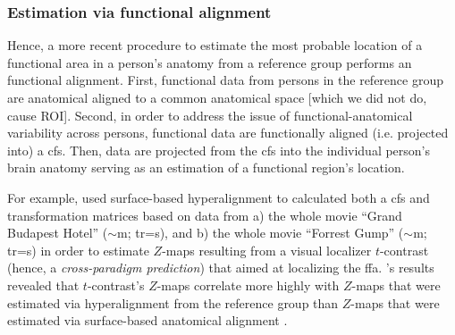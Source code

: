 \subsubsection{Estimation via functional alignment}




%
Hence, a more recent procedure \citep[e.g., ][]{jiahui2020predicting,
guntupalli2016model, haxby2011common} to estimate the most probable location of
a functional area in a person's anatomy from a reference group performs an
functional alignment.
First, functional data from persons in the reference group are anatomical
aligned to a common anatomical space [which we did not do, cause ROI].
%
Second, in order to address the issue of functional-anatomical variability
across persons, functional data are functionally aligned (i.e. projected into) a
\ac{cfs}.
%
Then, data are projected from the \ac{cfs} into the individual person's brain
anatomy serving as an estimation of a functional region's location.

For example, \citet{jiahui2020predicting} used surface-based hyperalignment to
calculated both a \ac{cfs} and transformation matrices based on data from a) the
whole movie ``Grand Budapest Hotel'' ($\sim$\unit[50]{m}; \ac{tr}=\unit[1]{s}),
and b) the whole movie ``Forrest Gump'' ($\sim$\unit[120]{m};
\ac{tr}=\unit[2]{s}) in order to estimate $Z$-maps resulting from a visual
localizer $t$-contrast (hence, a \textit{cross-paradigm prediction}) that aimed
at localizing the \ac{ffa}.
\citet{jiahui2020predicting}'s results revealed that $t$-contrast's $Z$-maps
correlate more highly with $Z$-maps that were estimated via hyperalignment from
the reference group than $Z$-maps that were estimated via surface-based
anatomical alignment \citep{jiahui2020predicting}.



